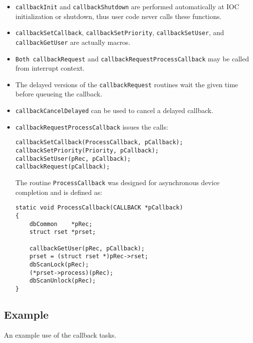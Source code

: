 \begin{itemize}
\item \verb|callbackInit| and \verb|callbackShutdown| are performed automatically at IOC initialization or shutdown,
thus user code never calls these functions.

\item \verb|callbackSetCallback|, \verb|callbackSetPriority|, \verb|callbackSetUser|, and \verb|callbackGetUser| are 
actually macros.

\item \verb|Both callbackRequest| and \verb|callbackRequestProcessCallback| may be called from interrupt context.

\item The delayed versions of the \verb|callbackRequest| routines wait the given time before queueing the callback.

\item \verb|callbackCancelDelayed| can be used to cancel a delayed callback.

\item \verb|callbackRequestProcessCallback| issues the calls:

\begin{verbatim}
callbackSetCallback(ProcessCallback, pCallback);
callbackSetPriority(Priority, pCallback);
callbackSetUser(pRec, pCallback);
callbackRequest(pCallback);
\end{verbatim}

The routine \verb|ProcessCallback| was designed for asynchronous device completion and is defined as:

\begin{verbatim}
static void ProcessCallback(CALLBACK *pCallback)
{
    dbCommon    *pRec;
    struct rset *prset;
 
    callbackGetUser(pRec, pCallback);
    prset = (struct rset *)pRec->rset;
    dbScanLock(pRec);
    (*prset->process)(pRec);
    dbScanUnlock(pRec);
}
\end{verbatim}

\end{itemize}

\subsection{Example}

An example use of the callback tasks.

